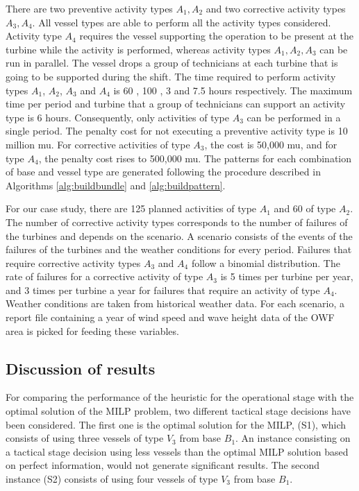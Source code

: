 There are two preventive activity types $A_1,A_2$ and two corrective activity types $A_3, A_4$. All vessel types are able to perform all the activity types considered. Activity type $A_4$ requires the vessel supporting the operation to be present at the turbine while the activity is performed, whereas activity types $A_1,A_2,A_3$ can be run in parallel. The vessel drops a group of technicians at each turbine that is going to be supported during the shift. The time required to perform activity types $A_1$, $A_2$, $A_3$ and $A_4$ is 60 , 100 , 3 and 7.5 hours respectively. The maximum time per period and turbine that a group of technicians can support an activity type is 6 hours. Consequently, only activities of type $A_3$ can be performed in a single period. The penalty cost for not executing a preventive activity type is 10 million mu. For corrective activities of type $A_3$, the cost is 50,000 mu, and for type $A_4$, the penalty cost rises to 500,000 mu. The patterns for each combination of base and vessel type are generated following the procedure described in Algorithms \ref{alg:buildbundle} and \ref{alg:buildpattern}.

For our case study, there are 125 planned activities of type $A_1$ and 60 of type $A_2$. The number of corrective activity types corresponds to the number of failures of the turbines and depends on the scenario. A scenario consists of the events of the failures of the turbines and the weather conditions for every period. Failures that require corrective activity types $A_3$ and $A_4$ follow a binomial distribution. The rate of failures for a corrective activity of type $A_3$ is 5 times per turbine per year, and 3 times per turbine a year for failures that require an activity of type $A_4$. Weather conditions are taken from historical weather data. For each scenario, a report file containing a year of wind speed and wave height data of the OWF area is picked for feeding these variables.

\subsection{Discussion of results}

For comparing the performance of the heuristic for the operational stage with the optimal solution of the MILP problem, two different tactical stage decisions have been considered. The first one is  the optimal solution for the MILP, (S1), which consists of using three vessels of type $V_3$ from base $B_1$. An instance consisting on a tactical stage decision using less vessels than the optimal MILP solution based on perfect information, would not generate significant results. The second instance (S2) consists of using four vessels of type $V_3$ from base $B_1$.

